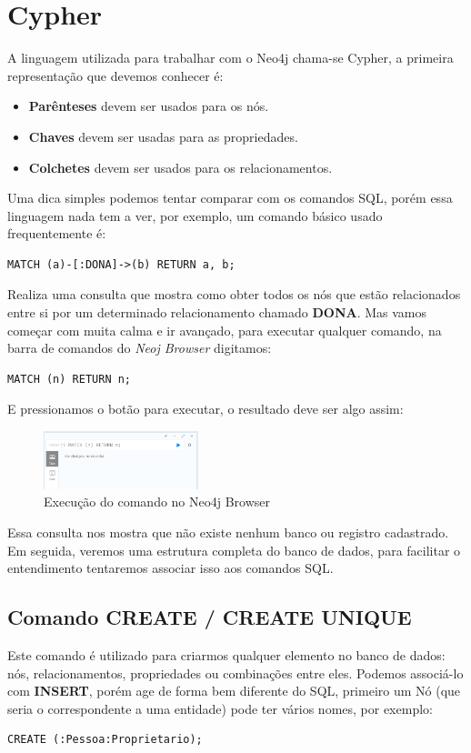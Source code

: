 \section{Cypher}
A linguagem utilizada para trabalhar com o Neo4j chama-se Cypher, a primeira representação que devemos conhecer é:
\begin{itemize}[nolistsep]
	\item \textbf{Parênteses} devem ser usados para os nós.
	\item \textbf{Chaves} devem ser usadas para as propriedades.
	\item \textbf{Colchetes} devem ser usados para os relacionamentos.
\end{itemize}

Uma dica simples podemos tentar comparar com os comandos SQL, porém essa linguagem nada tem a ver, por exemplo, um comando básico usado frequentemente é:
\begin{lstlisting}[]
MATCH (a)-[:DONA]->(b) RETURN a, b;
\end{lstlisting}

Realiza uma consulta que mostra como obter todos os nós que estão relacionados entre si por um determinado relacionamento chamado \textbf{DONA}. Mas vamos começar com muita calma e ir avançado, para executar qualquer comando, na barra de comandos do \textit{Neoj Browser} digitamos:
\begin{lstlisting}[]
MATCH (n) RETURN n;
\end{lstlisting}

E pressionamos o botão para executar, o resultado deve ser algo assim:
\begin{figure}[H]
	\centering
	\includegraphics[width=0.4\textwidth]{imagens/consulta}
	\caption{Execução do comando no Neo4j Browser}
\end{figure}

Essa consulta nos mostra que não existe nenhum banco ou registro cadastrado. Em seguida, veremos uma estrutura completa do banco de dados, para facilitar o entendimento tentaremos associar isso aos comandos SQL.

\subsection{Comando CREATE / CREATE UNIQUE}
Este comando é utilizado para criarmos qualquer elemento no banco de dados: nós, relacionamentos, propriedades ou combinações entre eles. Podemos associá-lo com \textbf{INSERT}, porém age de forma bem diferente do SQL, primeiro um Nó (que seria o correspondente a uma entidade) pode ter vários nomes, por exemplo:
\begin{lstlisting}[]
CREATE (:Pessoa:Proprietario);
\end{lstlisting}

